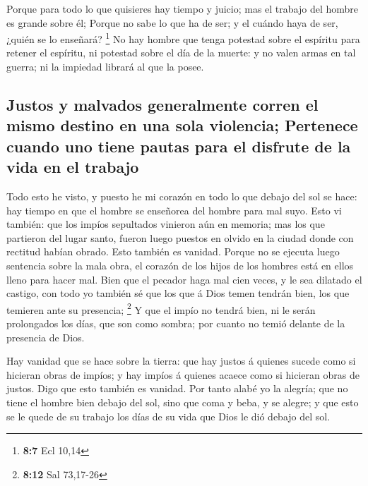  Porque para todo lo que quisieres hay tiempo y juicio; mas
el trabajo del hombre es grande sobre él;  Porque no sabe lo
que ha de ser; y el cuándo haya de ser, ¿quién se lo enseñará?
\footnote{\textbf{8:7} Ecl 10,14}  No hay hombre que tenga
potestad sobre el espíritu para retener el espíritu, ni potestad sobre
el día de la muerte: y no valen armas en tal guerra; ni la impiedad
librará al que la posee.

\hypertarget{justos-y-malvados-generalmente-corren-el-mismo-destino-en-una-sola-violencia-pertenece-cuando-uno-tiene-pautas-para-el-disfrute-de-la-vida-en-el-trabajo}{%
\subsection{Justos y malvados generalmente corren el mismo destino en
una sola violencia; Pertenece cuando uno tiene pautas para el disfrute
de la vida en el
trabajo}\label{justos-y-malvados-generalmente-corren-el-mismo-destino-en-una-sola-violencia-pertenece-cuando-uno-tiene-pautas-para-el-disfrute-de-la-vida-en-el-trabajo}}

 Todo esto he visto, y puesto he mi corazón en todo lo que
debajo del sol se hace: hay tiempo en que el hombre se enseñorea del
hombre para mal suyo.  Esto vi también: que los impíos
sepultados vinieron aún en memoria; mas los que partieron del lugar
santo, fueron luego puestos en olvido en la ciudad donde con rectitud
habían obrado. Esto también es vanidad.  Porque no se
ejecuta luego sentencia sobre la mala obra, el corazón de los hijos de
los hombres está en ellos lleno para hacer mal.  Bien que
el pecador haga mal cien veces, y le sea dilatado el castigo, con todo
yo también sé que los que á Dios temen tendrán bien, los que temieren
ante su presencia; \footnote{\textbf{8:12} Sal 73,17-26}  Y
que el impío no tendrá bien, ni le serán prolongados los días, que son
como sombra; por cuanto no temió delante de la presencia de Dios.

 Hay vanidad que se hace sobre la tierra: que hay justos á
quienes sucede como si hicieran obras de impíos; y hay impíos á quienes
acaece como si hicieran obras de justos. Digo que esto también es
vanidad.  Por tanto alabé yo la alegría; que no tiene el
hombre bien debajo del sol, sino que coma y beba, y se alegre; y que
esto se le quede de su trabajo los días de su vida que Dios le dió
debajo del sol.

